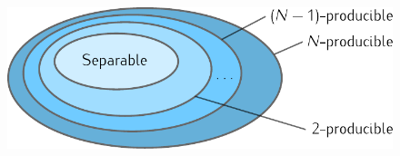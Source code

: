 \begin{figure}
  \centering
  \includegraphics[scale=.85]{img/BG_separability_k_producibility_circle.pdf}
  \caption[Diagram for $k$-producibility sets]{}
  \label{fig:bg-separability-k-producibility-circle}
\end{figure}

\be
  \label{eq:bg-pezze-bound}
  \qfi[\rho,J_z] \geq {}
\ee
